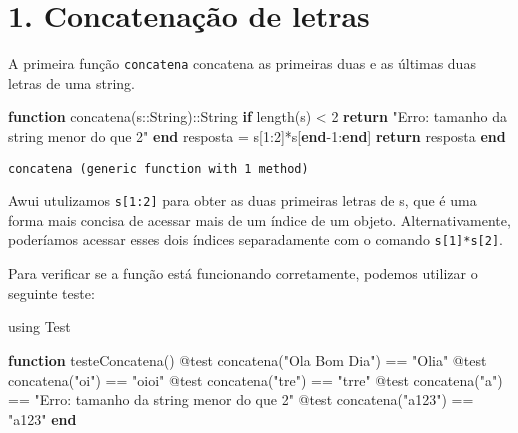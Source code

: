 \documentclass[
  letterpaper,
  DIV=11,
  numbers=noendperiod]{scrreprt}
\newenvironment{Shaded}{\begin{snugshade}}{\end{snugshade}}
\newcommand{\BuiltInTok}[1]{\textcolor[rgb]{0.00,0.23,0.31}{#1}}
\newcommand{\ControlFlowTok}[1]{\textcolor[rgb]{0.00,0.23,0.31}{\textbf{#1}}}
\newcommand{\DataTypeTok}[1]{\textcolor[rgb]{0.68,0.00,0.00}{#1}}
\newcommand{\FloatTok}[1]{\textcolor[rgb]{0.68,0.00,0.00}{#1}}
\newcommand{\FunctionTok}[1]{\textcolor[rgb]{0.28,0.35,0.67}{#1}}
\newcommand{\ImportTok}[1]{\textcolor[rgb]{0.00,0.46,0.62}{#1}}
\newcommand{\KeywordTok}[1]{\textcolor[rgb]{0.00,0.23,0.31}{\textbf{#1}}}
\newcommand{\NormalTok}[1]{\textcolor[rgb]{0.00,0.23,0.31}{#1}}
\newcommand{\OperatorTok}[1]{\textcolor[rgb]{0.37,0.37,0.37}{#1}}
\newcommand{\PreprocessorTok}[1]{\textcolor[rgb]{0.68,0.00,0.00}{#1}}
\newcommand{\StringTok}[1]{\textcolor[rgb]{0.13,0.47,0.30}{#1}}
\begin{document}
\section{1. Concatenação de letras}\label{concatenauxe7uxe3o-de-letras}

A primeira função \texttt{concatena} concatena as primeiras duas e as
últimas duas letras de uma string.

\begin{Shaded}
\begin{Highlighting}[]
\KeywordTok{function} \FunctionTok{concatena}\NormalTok{(s}\OperatorTok{::}\DataTypeTok{String}\NormalTok{)}\OperatorTok{::}\DataTypeTok{String}
    \ControlFlowTok{if} \FunctionTok{length}\NormalTok{(s) }\OperatorTok{\textless{}} \FloatTok{2}
        \ControlFlowTok{return} \StringTok{"Erro: tamanho da string menor do que 2"}
    \ControlFlowTok{end}
\NormalTok{    resposta }\OperatorTok{=}\NormalTok{ s[}\FloatTok{1}\OperatorTok{:}\FloatTok{2}\NormalTok{]}\OperatorTok{*}\NormalTok{s[}\KeywordTok{end}\OperatorTok{{-}}\FloatTok{1}\OperatorTok{:}\KeywordTok{end}\NormalTok{]}
    \ControlFlowTok{return}\NormalTok{ resposta}
\KeywordTok{end}
\end{Highlighting}
\end{Shaded}

\begin{verbatim}
concatena (generic function with 1 method)
\end{verbatim}

Awui utulizamos \texttt{s{[}1:2{]}} para obter as duas primeiras letras
de s, que é uma forma mais concisa de acessar mais de um índice de um
objeto. Alternativamente, poderíamos acessar esses dois índices
separadamente com o comando \texttt{s{[}1{]}*s{[}2{]}}.

Para verificar se a função está funcionando corretamente, podemos
utilizar o seguinte teste:

\begin{Shaded}
\begin{Highlighting}[]
\ImportTok{using} \BuiltInTok{Test}

\KeywordTok{function} \FunctionTok{testeConcatena}\NormalTok{()}
  \PreprocessorTok{@test} \FunctionTok{concatena}\NormalTok{(}\StringTok{"Ola Bom Dia"}\NormalTok{) }\OperatorTok{==} \StringTok{"Olia"}
  \PreprocessorTok{@test} \FunctionTok{concatena}\NormalTok{(}\StringTok{"oi"}\NormalTok{) }\OperatorTok{==} \StringTok{"oioi"}
  \PreprocessorTok{@test} \FunctionTok{concatena}\NormalTok{(}\StringTok{"tre"}\NormalTok{) }\OperatorTok{==} \StringTok{"trre"}
  \PreprocessorTok{@test} \FunctionTok{concatena}\NormalTok{(}\StringTok{"a"}\NormalTok{) }\OperatorTok{==} \StringTok{"Erro: tamanho da string menor do que 2"}
  \PreprocessorTok{@test} \FunctionTok{concatena}\NormalTok{(}\StringTok{"a123"}\NormalTok{) }\OperatorTok{==} \StringTok{"a123"}
\KeywordTok{end}
\end{Highlighting}
\end{Shaded}
\end{document}
